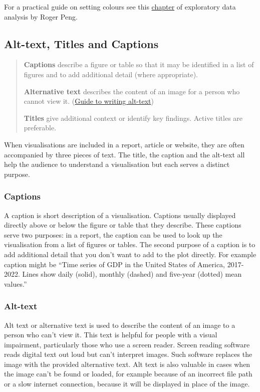 \documentclass[
  letterpaper,
  DIV=11,
  numbers=noendperiod]{scrreprt}
\begin{document}
For a practical guide on setting colours see this
\href{https://bookdown.org/rdpeng/exdata/plotting-and-color-in-r.html}{chapter}
of exploratory data analysis by Roger Peng.

\subsection{Alt-text, Titles and
Captions}\label{alt-text-titles-and-captions}

\begin{quote}
\textbf{Captions} describe a figure or table so that it may be
identified in a list of figures and to add additional detail (where
appropriate).

\textbf{Alternative text} describes the content of an image for a person
who cannot view it.
(\href{https://myaccessible.website/infographic/images/images-accessibility-alt-text}{Guide
to writing alt-text})

\textbf{Titles} give additional context or identify key findings. Active
titles are preferable.
\end{quote}

When visualisations are included in a report, article or website, they
are often accompanied by three pieces of text. The title, the caption
and the alt-text all help the audience to understand a visualisation but
each serves a distinct purpose.

\subsubsection{Captions}\label{captions}

A caption is short description of a visualisation. Captions usually
displayed directly above or below the figure or table that they
describe. These captions serve two purposes: in a report, the caption
can be used to look up the visualisation from a list of figures or
tables. The second purpose of a caption is to add additional detail that
you don't want to add to the plot directly. For example caption might be
``Time series of GDP in the United States of America, 2017-2022. Lines
show daily (solid), monthly (dashed) and five-year (dotted) mean
values.''

\subsubsection{Alt-text}\label{alt-text}

Alt text or alternative text is used to describe the content of an image
to a person who can't view it. This text is helpful for people with a
visual impairment, particularly those who use a screen reader. Screen
reading software reads digital text out loud but can't interpret images.
Such software replaces the image with the provided alternative text. Alt
text is also valuable in cases when the image can't be found or loaded,
for example because of an incorrect file path or a slow internet
connection, because it will be displayed in place of the image.
\end{document}
